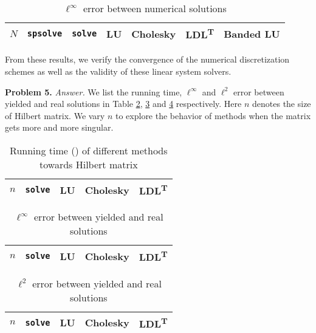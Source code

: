 \documentclass[english, nochinese]{pnote}
\begin{document}
\begin{table}[htb]
\centering
\small
\begin{tabular}{|c|c|c|c|c|c|c|}
\hline
$N$ & \verb"spsolve" & \verb"solve" & LU & Cholesky & LDL\textsuperscript{T} & Banded LU \\
\hline

\end{tabular}
\caption{$\ell^{\infty}$ error between numerical solutions}
\label{Tbl:NumNum}
\end{table}

From these results, we verify the convergence of the numerical discretization schemes as well as the validity of these linear system solvers.

\textbf{Problem 5.} \textit{Answer.} We list the running time, $\ell^{\infty}$ and $\ell^2$ error between yielded and real solutions in Table \ref{Tbl:Time}, \ref{Tbl:ErrInfty} and \ref{Tbl:Err2} respectively. Here $n$ denotes the size of Hilbert matrix. We vary $n$ to explore the behavior of methods when the matrix gets more and more singular.

\begin{table}[htb]
\centering
\begin{tabular}{|c|c|c|c|c|}
\hline
$n$ & \verb"solve" & LU & Cholesky & LDL\textsuperscript{T} \\
\hline

\end{tabular}
\caption{Running time () of different methods towards Hilbert matrix}
\label{Tbl:Time}
\end{table}

\begin{table}[htb]
\centering
\begin{tabular}{|c|c|c|c|c|}
\hline
$n$ & \verb"solve" & LU & Cholesky & LDL\textsuperscript{T} \\
\hline

\end{tabular}
\caption{$\ell^{\infty}$ error between yielded and real solutions}
\label{Tbl:ErrInfty}
\end{table}

\begin{table}[htb]
\centering
\begin{tabular}{|c|c|c|c|c|}
\hline
$n$ & \verb"solve" & LU & Cholesky & LDL\textsuperscript{T} \\
\hline

\end{tabular}
\caption{$\ell^2$ error between yielded and real solutions}
\label{Tbl:Err2}
\end{table}
\end{document}
